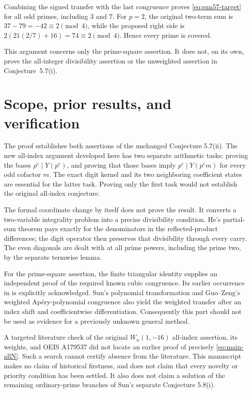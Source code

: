 \documentclass[11pt,a4paper]{article}
\numberwithin{equation}{section}
\theoremstyle{remark}
\begin{document}
Combining the signed transfer with the last congruence proves
\eqref{eq:sun57-target} for all odd primes, including $3$ and $7$.
For $p=2$, the original two-term sum is
$37-79=-42\equiv2\pmod4$, while the proposed right side is
$2(21(2/7)+16)=74\equiv2\pmod4$. Hence every prime is covered.

This argument concerns only the prime-square assertion. It does
not, on its own, prove the all-integer divisibility assertion or
the unweighted assertion in Conjecture~5.7(i).


\section{Scope, prior results, and verification}

The proof establishes both assertions of the unchanged Conjecture
5.7(ii). The new all-index argument developed here has two separate
arithmetic tasks: proving the bases \(p^e\mid Y(p^e)\), and proving
that those bases imply \(p^e\mid Y(p^em)\) for every odd cofactor
\(m\). The exact digit kernel and its two neighboring coefficient
states are essential for the latter task. Proving only the first
task would not establish the original all-index conjecture.

The formal coordinate change by itself does not prove the result.
It converts a two-variable integrality problem into a precise
divisibility condition. He's partial-sum theorem pays exactly for
the denominators in the reflected-product differences; the digit
operator then preserves that divisibility through every carry.
The even diagonals are dealt with at all prime powers, including
the prime two, by the separate termwise lemma.

For the prime-square assertion, the finite triangular identity
supplies an independent proof of the required known cubic
congruence. Its earlier occurrence in \cite{SunEuler2011} is
explicitly acknowledged. Sun's polynomial transformation
\cite[Theorem 1.1(i)]{SunApery2012} and Guo--Zeng's weighted
Ap\'ery-polynomial congruence \cite[Theorem 1.1(ii)]{GuoZeng2012}
also yield the weighted transfer after an index shift and
coefficientwise differentiation. Consequently this part should
not be used as evidence for a previously unknown general method.

A targeted literature check of the original \(W_n(1,-16)\)
all-index assertion, its weights, and OEIS A179537 did not locate
an earlier proof of precisely \eqref{eq:main-allN}. Such a search
cannot certify absence from the literature. This manuscript makes
no claim of historical firstness, and does not claim that every
novelty or priority condition has been settled. It also does not
claim a solution of the remaining ordinary-prime branches of
Sun's separate Conjecture 5.8(i).
\end{document}
